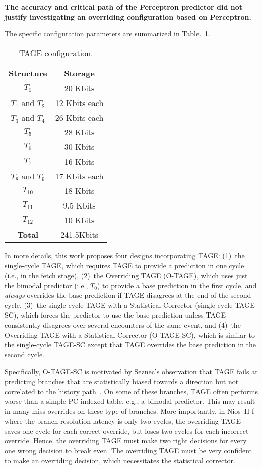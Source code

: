 \textbf{The accuracy and critical path of the Perceptron predictor did not justify investigating an overriding configuration based on Perceptron.}



The specific configuration parameters are summarized in Table.~\ref{tab:tageconfig}. 

\begin{table}[h]
\begin{center}
\begin{tabular} {|c|c|}
\hline
\textbf{Structure} & \textbf{Storage} \\ \hline
$T_0$ & 20 Kbits\\
$T_1$ and $T_2$ & 12 Kbits each\\
$T_3$ and $T_4$ & 26 Kbits each\\
$T_5$ & 28 Kbits\\
$T_6$ & 30 Kbits\\
$T_7$ & 16 Kbits\\
$T_8$ and $T_9$ & 17 Kbits each\\
$T_10$ & 18 Kbits\\
$T_11$ & 9.5 Kbits\\
$T_12$ & 10 Kbits\\ \hline
\textbf{Total} & 241.5Kbits \\ \hline
\end{tabular}
\caption{TAGE configuration.\label{tab:tageconfig}}
\end{center}
\end{table}



In more details, this work proposes four designs incorporating TAGE:  (1)~the single-cycle TAGE, which requires TAGE to provide a prediction in one cycle (i.e., in the fetch stage), (2)~the Overriding TAGE (\mbox{O-TAGE}), which uses just the bimodal predictor (i.e., $T_0$) to provide a base prediction in the first cycle, and \textit{always} overrides the base prediction if TAGE disagrees at the end of the second cycle, (3)~the single-cycle TAGE with a Statistical Corrector (single-cycle \mbox{TAGE-SC}), which forces the predictor to use the base prediction unless TAGE consistently disagrees over several encounters of the same event, and (4)~the Overriding TAGE with a Statistical Corrector (\mbox{O-TAGE-SC}), which is similar to the single-cycle \mbox{TAGE-SC} except that TAGE overrides the base prediction in the second cycle.

Specifically, \mbox{O-TAGE-SC} is motivated by Seznec's observation that TAGE fails at predicting branches that are statistically biased towards a direction but not correlated to the history path~\cite{isltage}. On some of these branches, TAGE often performs worse than a simple PC-indexed table, e.g., a bimodal predictor. This may result in many miss-overrides on these type of branches. More importantly, in Nios~II-f where the branch resolution latency is only two cycles, the overriding TAGE saves one cycle for each correct override, but loses two cycles for each incorrect override. Hence, the overriding TAGE must make two right decisions for every one wrong decision to break even. The overriding TAGE must be very confident to make an overriding decision, which necessitates the statistical corrector.

